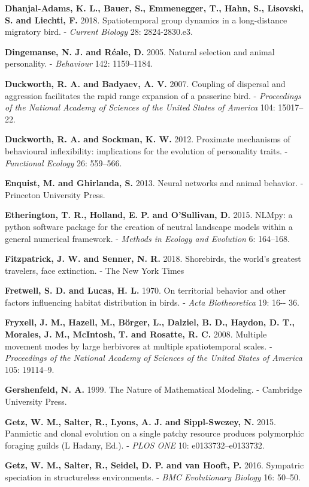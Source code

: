 \documentclass[]{scrartcl}
\begin{document}
\begin{multicols}{2}
\textbf{Dhanjal-Adams, K. L., Bauer, S., Emmenegger, T., Hahn, S.,
Lisovski, S. and Liechti, F.} 2018. Spatiotemporal group dynamics in a
long-distance migratory bird. - \emph{Current Biology} 28: 2824-2830.e3.

\textbf{Dingemanse, N. J. and Réale, D.} 2005. Natural selection and
animal personality. - \emph{Behaviour} 142: 1159--1184.

\textbf{Duckworth, R. A. and Badyaev, A. V.} 2007. Coupling of dispersal
and aggression facilitates the rapid range expansion of a passerine
bird. - \emph{Proceedings of the National Academy of Sciences of the
United States of America} 104: 15017--22.

\textbf{Duckworth, R. A. and Sockman, K. W.} 2012. Proximate mechanisms
of behavioural inflexibility: implications for the evolution of
personality traits. - \emph{Functional Ecology} 26: 559--566.

\textbf{Enquist, M. and Ghirlanda, S.} 2013. Neural networks and animal
behavior. - Princeton University Press.

\textbf{Etherington, T. R., Holland, E. P. and O'Sullivan, D.} 2015.
NLMpy: a python software package for the creation of neutral landscape
models within a general numerical framework. - \emph{Methods in Ecology
and Evolution} 6: 164--168.

\textbf{Fitzpatrick, J. W. and Senner, N. R.} 2018. Shorebirds, the
world's greatest travelers, face extinction. - The New York Times

\textbf{Fretwell, S. D. and Lucas, H. L.} 1970. On territorial behavior
and other factors influencing habitat distribution in birds. -
\emph{Acta Biotheoretica} 19: 16-\/- 36.

\textbf{Fryxell, J. M., Hazell, M., Börger, L., Dalziel, B. D., Haydon,
D. T., Morales, J. M., McIntosh, T. and Rosatte, R. C.} 2008. Multiple
movement modes by large herbivores at multiple spatiotemporal scales. -
\emph{Proceedings of the National Academy of Sciences of the United
States of America} 105: 19114--9.

\textbf{Gershenfeld, N. A.} 1999. The Nature of Mathematical Modeling. -
Cambridge University Press.

\textbf{Getz, W. M., Salter, R., Lyons, A. J. and Sippl-Swezey, N.}
2015. Panmictic and clonal evolution on a single patchy resource
produces polymorphic foraging guilds (L Hadany, Ed.). - \emph{PLOS ONE}
10: e0133732--e0133732.

\textbf{Getz, W. M., Salter, R., Seidel, D. P. and van Hooft, P.} 2016.
Sympatric speciation in structureless environments. - \emph{BMC
Evolutionary Biology} 16: 50--50.


\end{multicols}
\end{document}
